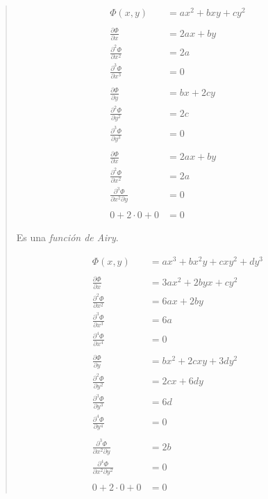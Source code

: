 \documentclass[a4paper,10pt,twoside,final,spanish]{article}
\begin{document}
\begin{enumerate}[a.]
\begin{quote}
\begin{minipage}{0.5\linewidth}
\begin{tcolorbox}[colback=gray!10!white,colframe=black!0!white]
\begin{align*}
\Phi(x,y) &= ax^{2}+bxy+cy^{2} \\ \\
\frac{\partial\Phi}{\partial x} &= 2ax+by \\
\frac{\partial^{2}\Phi}{\partial x^{2}} &= 2a \\
\frac{\partial^{3}\Phi}{\partial x^{3}} &= 0 \\ \\
\frac{\partial\Phi}{\partial y} &= bx+2cy \\
\frac{\partial^{2}\Phi}{\partial y^{2}} &= 2c \\
\frac{\partial^{3}\Phi}{\partial y^{3}} &= 0 \\ \\
\frac{\partial\Phi}{\partial x} &= 2ax+by \\
\frac{\partial^{2}\Phi}{\partial x^{2}} &= 2a \\
\frac{\partial^{3}\Phi}{\partial x^{2}\partial y} &= 0 \\ \\
0+2\cdot 0+0 &= 0
\end{align*}

Es una \textit{función de Airy}.

\end{tcolorbox}

\end{minipage} \hfill \begin{minipage}{0.5\linewidth}

\begin{tcolorbox}[colback=gray!10!white,colframe=black!0!white]

\begin{align*}
\Phi(x,y) &= ax^{3}+bx^{2}y+cxy^{2}+dy^{3} \\ \\
\frac{\partial\Phi}{\partial x} &= 3ax^{2}+2byx+cy^{2} \\
\frac{\partial^{2}\Phi}{\partial x^{2}} &= 6ax+2by \\
\frac{\partial^{3}\Phi}{\partial x^{3}} &= 6a \\
\frac{\partial^{4}\Phi}{\partial x^{4}} &= 0 \\ \\
\frac{\partial\Phi}{\partial y} &= bx^{2}+2cxy+3dy^{2} \\
\frac{\partial^{2}\Phi}{\partial y^{2}} &= 2cx+6dy \\
\frac{\partial^{3}\Phi}{\partial y^{3}} &= 6d \\
\frac{\partial^{4}\Phi}{\partial y^{4}} &= 0 \\ \\
\frac{\partial^{3}\Phi}{\partial x^{2}\partial y} &= 2b \\
\frac{\partial^{4}\Phi}{\partial x^{2}\partial y^{2}} &= 0 \\ \\
0+2\cdot 0+0 &= 0
\end{align*}


\end{tcolorbox}
\end{minipage}
\end{quote}
\end{enumerate}
\end{document}
